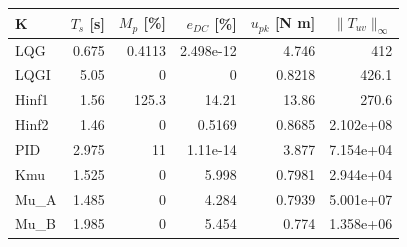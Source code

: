 \begin{center}\small\begin{tabular}{lrrrrr}\toprule
K & $T_s$ [s] & $M_p$ [\%] & $e_{DC}$ [\%] & $u_{pk}$ [N m] & $\|T_{uv}\|_\infty$\\\midrule
LQG & 0.675 & 0.4113 & 2.498e-12 & 4.746 & 412\\
LQGI & 5.05 & 0 & 0 & 0.8218 & 426.1\\
Hinf1 & 1.56 & 125.3 & 14.21 & 13.86 & 270.6\\
Hinf2 & 1.46 & 0 & 0.5169 & 0.8685 & 2.102e+08\\
PID & 2.975 & 11 & 1.11e-14 & 3.877 & 7.154e+04\\
Kmu & 1.525 & 0 & 5.998 & 0.7981 & 2.944e+04\\
Mu\_A & 1.485 & 0 & 4.284 & 0.7939 & 5.001e+07\\
Mu\_B & 1.985 & 0 & 5.454 & 0.774 & 1.358e+06\\
\bottomrule\end{tabular}
\end{center}
